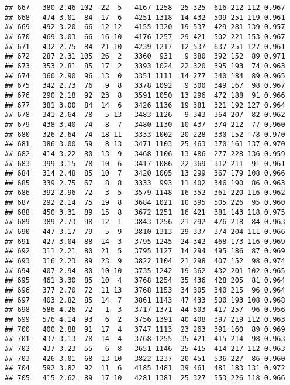 \documentclass[]{article}
\begin{document}
\begin{verbatim}
## 667   380 2.46 102  22  5   4167 1258  25 325  616 212 112 0.967
## 668   474 3.01  84  17  6   4251 1318  14 432  509 251 119 0.961
## 669   492 3.20  66  12 12   4155 1320  19 537  429 281 139 0.957
## 670   469 3.03  66  16 10   4176 1257  29 421  502 221 153 0.967
## 671   432 2.75  84  21 10   4239 1217  12 537  637 251 127 0.961
## 672   287 2.31 105  26  2   3360  931   9 380  392 152  89 0.971
## 673   353 2.81  85  17  2   3393 1024  22 320  395 193  74 0.963
## 674   360 2.90  96  13  0   3351 1111  14 277  340 184  89 0.965
## 675   342 2.73  76   9  8   3378 1092   9 300  349 167  98 0.967
## 676   290 2.18  92  23  8   3591 1050  13 296  472 188  91 0.966
## 677   381 3.00  84  14  6   3426 1136  19 381  321 192 127 0.964
## 678   341 2.64  78   5 13   3483 1126   9 343  364 207  82 0.962
## 679   438 3.40  74   8  7   3480 1130  10 437  374 212  77 0.960
## 680   326 2.64  74  18 11   3333 1002  20 228  330 152  78 0.970
## 681   386 3.00  59   8 13   3471 1103  25 463  370 161 137 0.970
## 682   414 3.22  80  13  9   3468 1106  13 486  277 228 136 0.959
## 683   399 3.15  78  10  6   3417 1086  22 369  312 211  91 0.961
## 684   314 2.48  85  10  7   3420 1005  13 299  367 179 108 0.966
## 685   339 2.75  67   8  8   3333  993  11 402  346 190  86 0.963
## 686   392 2.96  72   3  5   3579 1148  16 352  361 220 116 0.962
## 687   292 2.14  75  19  8   3684 1021  10 395  505 226  95 0.960
## 688   450 3.31  89  15  8   3672 1251  16 421  381 143 118 0.975
## 689   389 2.73  98  12  1   3843 1256  21 292  476 218  84 0.963
## 690   447 3.17  79   5  9   3810 1313  29 337  374 204 111 0.966
## 691   427 3.04  88  14  3   3795 1245  24 342  468 173 116 0.969
## 692   311 2.21  80  21  5   3795 1127  14 294  495 186  87 0.969
## 693   316 2.23  89  23  9   3822 1104  21 298  407 152  98 0.974
## 694   407 2.94  80  10 10   3735 1242  19 362  432 201 102 0.965
## 695   461 3.30  85  10  4   3768 1254  35 436  428 205  81 0.964
## 696   377 2.70  72  11 13   3768 1153  34 305  340 215  96 0.964
## 697   403 2.82  85  14  7   3861 1143  47 433  500 193 108 0.968
## 698   586 4.26  72   1  3   3717 1371  44 503  417 257  96 0.956
## 699   576 4.14  93   6  2   3756 1391  40 408  397 219 112 0.963
## 700   400 2.88  91  17  4   3747 1113  23 263  391 160  89 0.969
## 701   437 3.13  78  14  4   3768 1255  35 421  415 214  98 0.963
## 702   437 3.23  55   6  8   3651 1146  25 415  414 217 112 0.963
## 703   426 3.01  68  13 10   3822 1237  20 451  536 227  86 0.960
## 704   592 3.82  92  11  6   4185 1481  39 461  481 183 131 0.972
## 705   415 2.62  89  17 10   4281 1381  25 327  553 226 118 0.966

\end{verbatim}
\end{document}
